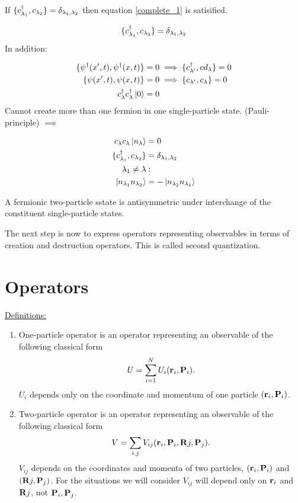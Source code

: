 If $\{c^{\dagger}_{\lambda_1}, c_{\lambda_2}\}= \delta_{\lambda_1, \lambda_2}$ then equation \eqref{complete_1} is satisified.

\begin{equation}
	\{c^{\dagger}_{\lambda_1}, c_{\lambda_2}\}= \delta_{\lambda_1, \lambda_2}
\end{equation}

\noindent $\underline{\text{In addition:}}$

\begin{align}
	\{ \psi^\dagger(x',t), \psi^\dagger(x,t) \} &= 0 \implies \{c^{\dagger}_{\lambda'}, cd_\lambda\} =0\\
	\{ \psi(x',t), \psi(x,t) \} &= 0 \implies \{c_{\lambda'}, c_\lambda\} =0\\
	c^{\dagger}_\lambda c^{\dagger}_\lambda \ket{0}&=0
\end{align}
Cannot create more than one fermion in one single-particle state. (Pauli-principle) $\implies$

\begin{align*}
	c_\lambda c_\lambda \ket{n_\lambda}&=0\\
	\{c^{\dagger}_{\lambda_1},c_{\lambda_2}\}&= \delta_{\lambda_1, \lambda_2}\\
	\lambda_1 \neq \lambda &:\\
	\ket{n_{\lambda_1} n_{\lambda_2}} &= - \ket{n_{\lambda_2} n_{\lambda_1}}
\end{align*}

\noindent A fermionic two-particle sstate is antisymmetric under interchange of the constituent single-particle states.

\begin{tcolorbox}
	The next step is now to express operators representing observables in terms of creation and destruction operators. This is called $\underline{\text{second quantization}}$.
\end{tcolorbox}

\section{Operators}

\noindent \uline{Definitions:}

\begin{enumerate}
	\item
	One-particle operator is an operator representing an observable of the following classical form
	\begin{equation}
		U= \sum_{i=1}^{N} U_i(\vb{r}_i, \vb{P}_i).
	\end{equation}
	$U_i$ depends only on the coordinate and momentum of one particle $(\vb{r}_i, \vb{P}_i)$.
	\item
	Two-particle operator is an operator representing an observable of the following classical form
	\begin{equation}
		V= \sum_{i,j } V_{ij} (\vb{r}_i, \vb{P}_i,\vb{R}j, \vb{P}_j).
	\end{equation}
	$V_{ij}$ depends on the coordinates and momenta of two particles, $(\vb{r}_i, \vb{P}_i)$ and $(\vb{R}j, \vb{P}_j)$. For the situations we will consider $V_{ij}$ will depend only on $\vb{r}_i$ and $\vb{R}j$, not $\vb{P}_i, \vb{P}_j$.
\end{enumerate}

